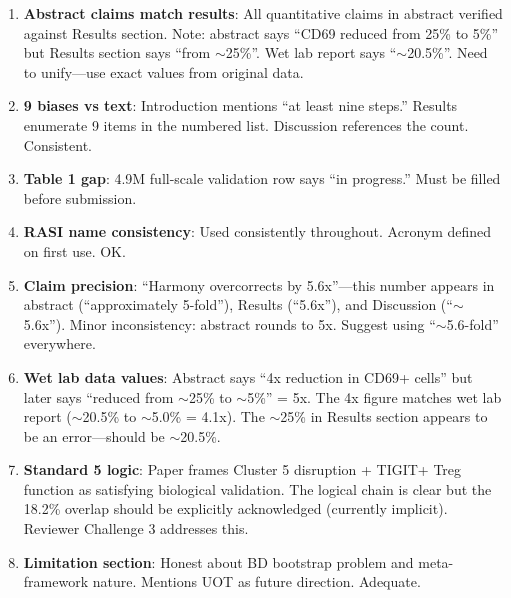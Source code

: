 \begin{enumerate}
\item \textbf{Abstract claims match results}: All quantitative claims in abstract verified against Results section. Note: abstract says ``CD69 reduced from 25\% to 5\%'' but Results section says ``from $\sim$25\%''. Wet lab report says ``$\sim$20.5\%''. Need to unify---use exact values from original data.

\item \textbf{9 biases vs text}: Introduction mentions ``at least nine steps.'' Results enumerate 9 items in the numbered list. Discussion references the count. Consistent.

\item \textbf{Table 1 gap}: 4.9M full-scale validation row says ``in progress.'' Must be filled before submission.

\item \textbf{RASI name consistency}: Used consistently throughout. Acronym defined on first use. OK.

\item \textbf{Claim precision}: ``Harmony overcorrects by 5.6x''---this number appears in abstract (``approximately 5-fold''), Results (``5.6x''), and Discussion (``$\sim$5.6x''). Minor inconsistency: abstract rounds to 5x. Suggest using ``$\sim$5.6-fold'' everywhere.

\item \textbf{Wet lab data values}: Abstract says ``4x reduction in CD69+ cells'' but later says ``reduced from $\sim$25\% to $\sim$5\%'' = 5x. The 4x figure matches wet lab report ($\sim$20.5\% to $\sim$5.0\% = 4.1x). The $\sim$25\% in Results section appears to be an error---should be $\sim$20.5\%.

\item \textbf{Standard 5 logic}: Paper frames Cluster 5 disruption + TIGIT+ Treg function as satisfying biological validation. The logical chain is clear but the 18.2\% overlap should be explicitly acknowledged (currently implicit). Reviewer Challenge 3 addresses this.

\item \textbf{Limitation section}: Honest about BD bootstrap problem and meta-framework nature. Mentions UOT as future direction. Adequate.
\end{enumerate}
